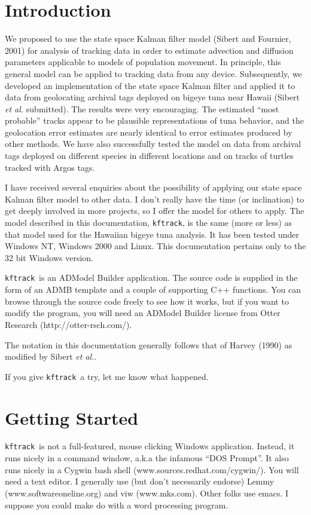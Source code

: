 \documentclass[12pt,draft,titlepage,twoside]{article}
\def\kftrack{\texttt{kftrack}}
\begin{document}
\section{Introduction}

We proposed to use the state space Kalman filter model (Sibert and Fournier, 2001)
for analysis of tracking data in order to 
estimate advection and diffusion parameters applicable
to models of population movement. In principle, this general model can be 
applied to tracking data from any device. 
Subsequently, we developed an implementation of the 
state space Kalman filter and applied it to data from geolocating archival tags deployed on bigeye tuna near Hawaii (Sibert {\it et al.} submitted).
The results were very encouraging.
The estimated ``most probable'' tracks appear to be plausible representations of 
tuna behavior, and
the geolocation error estimates are
nearly identical to error estimates produced by other methods.
We have also successfully tested the model on data from archival tags 
deployed on different species in different locations and on tracks of turtles tracked with Argos tags. 

I have received several enquiries about the possibility of applying our state space Kalman filter model to other data. 
I don't really have the time (or inclination) to get
deeply involved in more projects, so I offer the model for others to apply.
The model described in this documentation, \kftrack,
is the same (more or less) as that model used for the 
Hawaiian bigeye tuna analysis.
It has been tested under Windows NT, Windows 2000 and Linux.
This documentation pertains only to the 32 bit Windows version.

\kftrack\ is an ADModel Builder application. The source code is supplied
in the form of an ADMB template and a couple of supporting C++ functions.
You can browse through the source code freely to see how it works, but if you want to modify the program, you will need an ADModel Builder license from Otter Research (http://otter-rsch.com/).

The notation in this documentation generally follows that of Harvey (1990) as modified by Sibert {\it et al.}.

If you give \kftrack\ a try, let me know what happened.


\section{Getting Started}
\kftrack\ is not a full-featured, mouse clicking Windows application.
Instead, it runs nicely in a command window, a.k.a the infamous ``DOS Prompt''.
It also runs nicely in a Cygwin bash shell (www.sources.redhat.com/cygwin/).
You will need a text editor.  
I generally use (but don't necessarily endorse) Lemmy (www.softwareoneline.org) 
and viw (www.mks.com). Other folks use emacs. I suppose you could make do with
a word processing program.
\end{document}
